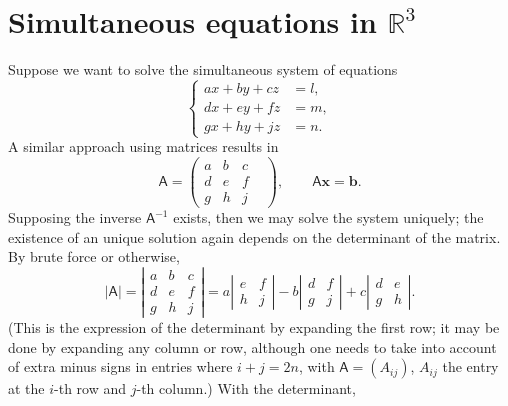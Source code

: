\documentclass[letter-paper]{tufte-book}
\newcommand{\bb}{\boldsymbol{b}}
\newcommand{\xb}{\boldsymbol{x}}
\begin{document}

\section{Simultaneous equations in $\mathbb{R}^3$}

Suppose we want to solve the simultaneous system of equations
\begin{equation*}
	\begin{cases}ax+by+cz&=l,\\ dx+ey+fz&=m,\\ gx+hy+jz&=n.\end{cases}
\end{equation*}
A similar approach using matrices results in
\begin{equation*}
	\mathsf{A}=\begin{pmatrix}a & b & c\\ d & e & f &\\ g & h & j \end{pmatrix},
	\qquad \mathsf{A}\xb=\bb.
\end{equation*}
Supposing the inverse $\mathsf{A}^{-1}$ exists, then we may solve the system
uniquely; the existence of an unique solution again depends on the determinant
of the matrix. By brute force or otherwise,
\begin{equation}
	|\mathsf{A}|=\left|\begin{matrix}a & b & c\\ d & e & f \\ g & h & j
	\end{matrix}\right|=
	a\left|\begin{matrix}e & f \\ h & j\end{matrix}\right|
	-b\left|\begin{matrix} d & f \\ g & j \end{matrix}\right|
	+c\left|\begin{matrix} d & e \\ g & h \end{matrix}\right|.
\end{equation}
(This is the expression of the determinant by expanding the first row; it may be
done by expanding any column or row, although one needs to take into account of
extra minus signs in entries where $i+j=2n$, with $\mathsf{A}=(A_{ij})$,
$A_{ij}$ the entry at the $i$-th row and $j$-th column.) With the determinant,
\end{document}
